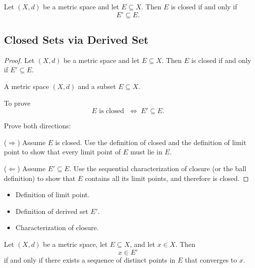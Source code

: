 \begin{theorem}
Let $(X,d)$ be a metric space and let $E \subseteq X$.
Then $E$ is closed if and only if
\[
E' \subseteq E.
\]
\end{theorem}



\subsection*{Closed Sets via Derived Set}
\label{prf:closed-derived-set}

\begin{proof}
\Claim Let $(X,d)$ be a metric space and let $E \subseteq X$.
Then $E$ is closed if and only if $E' \subseteq E$.

\Given A metric space $(X,d)$ and a subset $E \subseteq X$.

\Goal To prove
\[
E \text{ is closed }
\;\Longleftrightarrow\;
E' \subseteq E.
\]

\Strategy Prove both directions:

\medskip

\noindent
($\Rightarrow$) Assume $E$ is closed.
Use the definition of closed and the definition of limit point
to show that every limit point of $E$ must lie in $E$.

\medskip

\noindent
($\Leftarrow$) Assume $E' \subseteq E$.
Use the sequential characterization of closure (or the ball definition)
to show that $E$ contains all its limit points,
and therefore is closed.

\end{proof}

\begin{remark*}[Dependencies]
\begin{itemize}
  \item Definition of limit point.
  \item Definition of derived set $E'$.
  \item Characterization of closure.
\end{itemize}
\end{remark*}


\begin{theorem}
Let $(X,d)$ be a metric space, let $E \subseteq X$, and let $x \in X$.
Then
\[
x \in E'
\]
if and only if there exists a sequence of distinct points in $E$
that converges to $x$.
\end{theorem}


